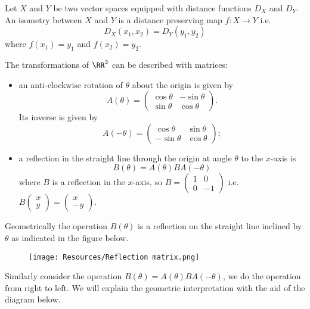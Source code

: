 \documentclass[12pt, a4paper]{article}
\begin{document}
\begin{definition}
    Let \(X\) and \(Y\) be two vector spaces equipped with distance functions \(D_X\) and \(D_Y\). An isometry between \(X\) and \(Y\) is a distance preserving map \(f:X\to Y\) i.e.
    \[D_X(x_1,x_2)=D_Y(y_1,y_2)\]
    where \(f(x_1)=y_1\) and \(f(x_2)=y_2\).
\end{definition}

The transformations of \(\RR^2\) can be described with matrices:
\begin{itemize}
    \item an anti-clockwise rotation of \(\theta\) about the origin is given by 
    \[
        A(\theta) = \begin{pmatrix}
                        \cos\theta & -\sin\theta \\
                        \sin\theta & \cos\theta
                    \end{pmatrix}.
    \]
    Its inverse is given by 
    \[A(-\theta)= \begin{pmatrix}
        \cos\theta & \sin\theta \\
        -\sin\theta & \cos\theta
    \end{pmatrix};\]
    \item a reflection in the straight line through the origin at angle \(\theta\) to the \(x\)-axis is 
    \[B(\theta) = A(\theta)BA(-\theta)\]
    where \(B\) is a reflection in the \(x\)-axis, so \(B=\begin{pmatrix}
        1&0 \\
        0&-1
    \end{pmatrix}\) i.e. \(B\begin{pmatrix}
        x\\y
    \end{pmatrix} = \begin{pmatrix}
        x \\ -y
    \end{pmatrix}.\)
\end{itemize}

Geometrically the operation \(B(\theta)\) is a reflection on the straight line inclined by \(\theta\) as indicated in the figure below.
\begin{figure}[H]
    \begin{center}
        \texttt{[image: Resources/Reflection matrix.png]}
    \end{center}
\end{figure}

Similarly consider the operation \(B(\theta) = A(\theta) B A(-\theta)\), we do the operation from right to left. We will explain the geometric interpretation with the aid of the diagram below.
\end{document}
